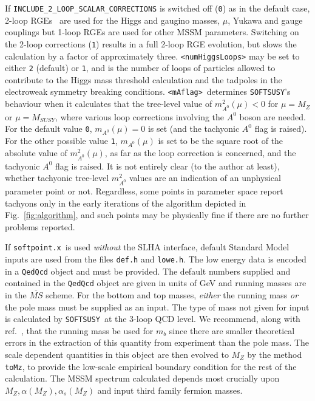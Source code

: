 \documentclass[]{article}
\def\SOFTSUSY{{\tt SOFTSUSY}}
\def\code#1{\small{\tt #1}\normalsize}
\begin{document}
If \code{INCLUDE\_2\_LOOP\_SCALAR\_CORRECTIONS} is switched off (\code{0}) as
in the default case, 
2-loop RGEs~\cite{mandv}
 are used for the Higgs and gaugino masses, $\mu$, Yukawa and gauge
couplings but  
1-loop RGEs are used for other MSSM parameters. Switching on the 2-loop
corrections (\code{1})
results in a full 2-loop RGE evolution, but slows the calculation by a factor
of approximately three.
\code{<numHiggsLoops>} may be set to either \code{2} (default) or \code{1},
and is the number of loops of particles allowed to contribute to the Higgs
mass threshold calculation and the tadpoles in the electroweak symmetry
breaking conditions.
\code{<mAflag>}~determines \SOFTSUSY's behaviour when it calculates that the
tree-level value of $m_{A^0}^2(\mu)<0$ for $\mu=M_Z$ or $\mu=M_{SUSY}$, where
various loop corrections involving the 
$A^0$ boson are needed. For the default value \code{0}, $m_{A^0}(\mu)=0$ is
set (and the tachyonic $A^0$ flag is raised). For the other possible value
\code{1}, $m_{A^0}(\mu)$ is set to be the square root of the absolute value of
$m_{A^0}^2(\mu)$, as far as the loop correction is concerned, and the
tachyonic $A^0$ flag is raised. It is not entirely clear (to the author at
least), whether tachyonic tree-level $m_{A^0}^2$ values are an indication of
an unphysical parameter point or not. Regardless, some points in parameter
space report tachyons only in the 
early iterations of the algorithm depicted in Fig.~\ref{fig:algorithm},
 and such points may
be physically fine if there are no further problems reported. 

If \code{softpoint.x}~is used {\em without}\/ the SLHA interface, default
Standard Model inputs are used from the files \code{def.h} and \code{lowe.h}.
The low energy data is encoded in a \code{QedQcd} object and must be
provided. 
The default numbers supplied and contained in the \code{QedQcd} object 
are given in units of
GeV and running masses are in the $\overline{MS}$ scheme. 
For the bottom and
top masses, {\em either}\/ the running mass {\em 
  or}\/ the pole mass must be supplied as an input. The type of mass not given
for input is  calculated
by \SOFTSUSY~at the 3-loop QCD level. We recommend, along with
ref.~\cite{bottomMass}, that the
running mass be used for $m_b$ since there are smaller theoretical errors in
the 
extraction of this quantity from experiment than the pole mass. 
The scale dependent quantities in this object are then evolved to $M_Z$ by 
the method \code{toMz}, to provide the low-scale empirical boundary condition
for the rest of the calculation. The MSSM spectrum calculated depends most
crucially upon $M_Z, \alpha(M_Z), \alpha_s(M_Z)$ and input third family
fermion masses.
\end{document}

